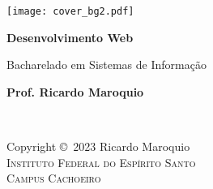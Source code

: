 \documentclass[
	11pt, %
	fleqn, %
	a4paper, %
        twoside,
]{ifescai}
\begin{document}


\titlepage %
	{\texttt{[image: cover\_bg2.pdf]}} %
	{ %
		\centering\sffamily %
		{\Huge\bfseries Desenvolvimento Web\par} %
		\vspace{4pt} %
		{\LARGE Bacharelado em Sistemas de Informação\par} %
		\vspace{24pt} %
		{\huge\bfseries Prof. Ricardo Maroquio\par} %
	}

\sffamily
\normalsize
\setlength{\parskip}{12pt}
\thispagestyle{empty} %

~\vfill %

\noindent Copyright \copyright\ 2023 Ricardo Maroquio\\ %

\noindent \textsc{Instituto Federal do Espírito Santo}\\ %
\noindent \textsc{Campus Cachoeiro}\\ %
\end{document}

